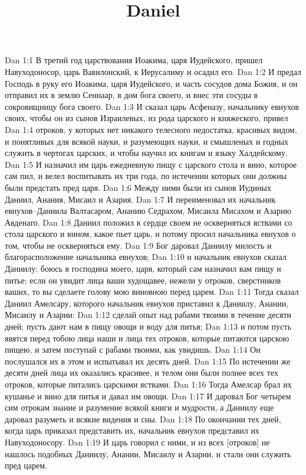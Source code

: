 

\title{Daniel}

Dan 1:1  В третий год царствования Иоакима, царя Иудейского, пришел Навуходоносор, царь Вавилонский, к Иерусалиму и осадил его.
Dan 1:2  И предал Господь в руку его Иоакима, царя Иудейского, и часть сосудов дома Божия, и он отправил их в землю Сеннаар, в дом бога своего, и внес эти сосуды в сокровищницу бога своего.
Dan 1:3  И сказал царь Асфеназу, начальнику евнухов своих, чтобы он из сынов Израилевых, из рода царского и княжеского, привел
Dan 1:4  отроков, у которых нет никакого телесного недостатка, красивых видом, и понятливых для всякой науки, и разумеющих науки, и смышленых и годных служить в чертогах царских, и чтобы научил их книгам и языку Халдейскому.
Dan 1:5  И назначил им царь ежедневную пищу с царского стола и вино, которое сам пил, и велел воспитывать их три года, по истечении которых они должны были предстать пред царя.
Dan 1:6  Между ними были из сынов Иудиных Даниил, Анания, Мисаил и Азария.
Dan 1:7  И переименовал их начальник евнухов--Даниила Валтасаром, Ананию Седрахом, Мисаила Мисахом и Азарию Авденаго.
Dan 1:8  Даниил положил в сердце своем не оскверняться яствами со стола царского и вином, какое пьет царь, и потому просил начальника евнухов о том, чтобы не оскверняться ему.
Dan 1:9  Бог даровал Даниилу милость и благорасположение начальника евнухов;
Dan 1:10  и начальник евнухов сказал Даниилу: боюсь я господина моего, царя, который сам назначил вам пищу и питье; если он увидит лица ваши худощавее, нежели у отроков, сверстников ваших, то вы сделаете голову мою виновною перед царем.
Dan 1:11  Тогда сказал Даниил Амелсару, которого начальник евнухов приставил к Даниилу, Анании, Мисаилу и Азарии:
Dan 1:12  сделай опыт над рабами твоими в течение десяти дней; пусть дают нам в пищу овощи и воду для питья;
Dan 1:13  и потом пусть явятся перед тобою лица наши и лица тех отроков, которые питаются царскою пищею, и затем поступай с рабами твоими, как увидишь.
Dan 1:14  Он послушался их в этом и испытывал их десять дней.
Dan 1:15  По истечении же десяти дней лица их оказались красивее, и телом они были полнее всех тех отроков, которые питались царскими яствами.
Dan 1:16  Тогда Амелсар брал их кушанье и вино для питья и давал им овощи.
Dan 1:17  И даровал Бог четырем сим отрокам знание и разумение всякой книги и мудрости, а Даниилу еще даровал разуметь и всякие видения и сны.
Dan 1:18  По окончании тех дней, когда царь приказал представить их, начальник евнухов представил их Навуходоносору.
Dan 1:19  И царь говорил с ними, и из всех [отроков] не нашлось подобных Даниилу, Анании, Мисаилу и Азарии, и стали они служить пред царем.
